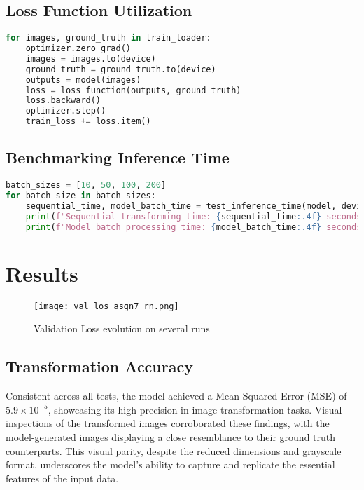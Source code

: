 \documentclass[12pt, a4paper]{article}
\begin{document}
\subsection{Loss Function Utilization}
\begin{lstlisting}[language=Python, caption=Training loop snippet showing MSE loss calculation]
for images, ground_truth in train_loader:
    optimizer.zero_grad()
    images = images.to(device)
    ground_truth = ground_truth.to(device)
    outputs = model(images)
    loss = loss_function(outputs, ground_truth)
    loss.backward()
    optimizer.step()
    train_loss += loss.item()
\end{lstlisting}

\subsection{Benchmarking Inference Time}
\begin{lstlisting}[language=Python, caption=Benchmarking inference time with varying batch sizes]
batch_sizes = [10, 50, 100, 200]
for batch_size in batch_sizes:
    sequential_time, model_batch_time = test_inference_time(model, device, batch_size)
    print(f"Sequential transforming time: {sequential_time:.4f} seconds")
    print(f"Model batch processing time: {model_batch_time:.4f} seconds")
\end{lstlisting}

\section{Results}

\begin{figure}[ht]
  \centering
  \begin{minipage}[b]{0.9\textwidth}
    \texttt{[image: val\_los\_asgn7\_rn.png]}
    \caption{Validation Loss evolution on several runs}
    \label{fig:validation_loss}
  \end{minipage}
\end{figure}


\subsection{Transformation Accuracy}
Consistent across all tests, the model achieved a Mean Squared Error (MSE) of \( 5.9 \times 10^{-5} \), showcasing its high precision in image transformation tasks. Visual inspections of the transformed images corroborated these findings, with the model-generated images displaying a close resemblance to their ground truth counterparts. This visual parity, despite the reduced dimensions and grayscale format, underscores the model's ability to capture and replicate the essential features of the input data.
 
\end{document}
